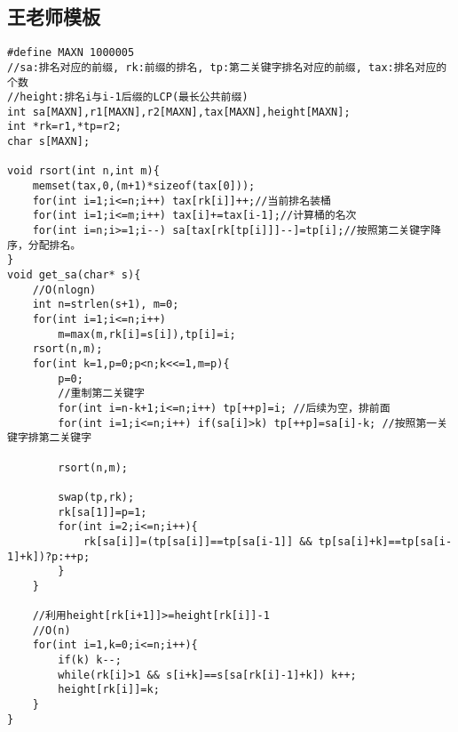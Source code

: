 \subsection{王老师模板}
\begin{lstlisting}
#define MAXN 1000005
//sa:排名对应的前缀, rk:前缀的排名, tp:第二关键字排名对应的前缀, tax:排名对应的个数
//height:排名i与i-1后缀的LCP(最长公共前缀)
int sa[MAXN],r1[MAXN],r2[MAXN],tax[MAXN],height[MAXN];
int *rk=r1,*tp=r2;
char s[MAXN];

void rsort(int n,int m){
	memset(tax,0,(m+1)*sizeof(tax[0]));
	for(int i=1;i<=n;i++) tax[rk[i]]++;//当前排名装桶
	for(int i=1;i<=m;i++) tax[i]+=tax[i-1];//计算桶的名次
	for(int i=n;i>=1;i--) sa[tax[rk[tp[i]]]--]=tp[i];//按照第二关键字降序，分配排名。
}
void get_sa(char* s){
	//O(nlogn)
	int n=strlen(s+1), m=0;
	for(int i=1;i<=n;i++)
		m=max(m,rk[i]=s[i]),tp[i]=i;
	rsort(n,m);
	for(int k=1,p=0;p<n;k<<=1,m=p){
		p=0;
		//重制第二关键字
		for(int i=n-k+1;i<=n;i++) tp[++p]=i; //后续为空，排前面
		for(int i=1;i<=n;i++) if(sa[i]>k) tp[++p]=sa[i]-k; //按照第一关键字排第二关键字

		rsort(n,m);
	
		swap(tp,rk);
		rk[sa[1]]=p=1;
		for(int i=2;i<=n;i++){
			rk[sa[i]]=(tp[sa[i]]==tp[sa[i-1]] && tp[sa[i]+k]==tp[sa[i-1]+k])?p:++p;
		}
	}

	//利用height[rk[i+1]]>=height[rk[i]]-1
	//O(n)
	for(int i=1,k=0;i<=n;i++){
		if(k) k--;
		while(rk[i]>1 && s[i+k]==s[sa[rk[i]-1]+k]) k++;
		height[rk[i]]=k;
	}
}
\end{lstlisting}